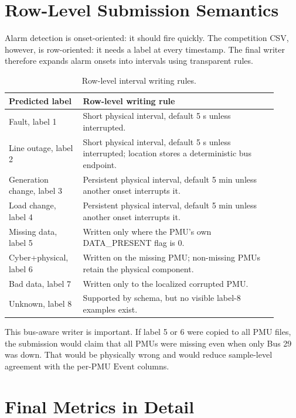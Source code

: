 \documentclass[11pt]{article}
\newcommand{\Event}{\ensuremath{\mathrm{Event}}}
\begin{document}
\section{Row-Level Submission Semantics}

Alarm detection is onset-oriented: it should fire quickly. The competition CSV,
however, is row-oriented: it needs a label at every timestamp. The final writer
therefore expands alarm onsets into intervals using transparent rules.

\begin{table}[H]
\centering
\caption{Row-level interval writing rules.}
\begin{tabular}{p{0.25\linewidth}p{0.66\linewidth}}
\toprule
Predicted label & Row-level writing rule \\
\midrule
Fault, label 1 & Short physical interval, default 5 s unless interrupted. \\
Line outage, label 2 & Short physical interval, default 5 s unless interrupted;
location stores a deterministic bus endpoint. \\
Generation change, label 3 & Persistent physical interval, default 5 min unless
another onset interrupts it. \\
Load change, label 4 & Persistent physical interval, default 5 min unless another
onset interrupts it. \\
Missing data, label 5 & Written only where the PMU's own DATA\_PRESENT flag is 0. \\
Cyber+physical, label 6 & Written on the missing PMU; non-missing PMUs retain the
physical component. \\
Bad data, label 7 & Written only to the localized corrupted PMU. \\
Unknown, label 8 & Supported by schema, but no visible label-8 examples exist. \\
\bottomrule
\end{tabular}
\label{tab:writer_rules}
\end{table}

This bus-aware writer is important. If label 5 or 6 were copied to all PMU files,
the submission would claim that all PMUs were missing even when only Bus 29 was
down. That would be physically wrong and would reduce sample-level agreement
with the per-PMU \Event{} columns.

\section{Final Metrics in Detail}
\end{document}
